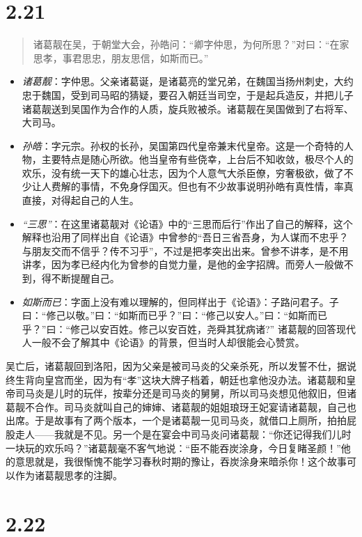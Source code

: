 \documentclass[]{book}
\providecommand{\tightlist}{%
  \setlength{\itemsep}{0pt}\setlength{\parskip}{0pt}}
\begin{document}
\section{2.21}\label{section-67}

\begin{quote}
诸葛靓在吴，于朝堂大会，孙皓问：``卿字仲思，为何所思？''对曰：``在家思孝，事君思忠，朋友思信，如斯而已。''
\end{quote}

\begin{itemize}
\tightlist
\item
  \emph{诸葛靓}：字仲思。父亲诸葛诞，是诸葛亮的堂兄弟，在魏国当扬州刺史，大约忠于魏国，受到司马昭的猜疑，要召入朝廷当司空，于是起兵造反，并把儿子诸葛靓送到吴国作为合作的人质，旋兵败被杀。诸葛靓在吴国做到了右将军、大司马。
\item
  \emph{孙皓}：字元宗。孙权的长孙，吴国第四代皇帝兼末代皇帝。这是一个奇特的人物，主要特点是随心所欲。他当皇帝有些侥幸，上台后不知收敛，极尽个人的欢乐，没有统一天下的雄心壮志，因为个人意气大杀臣僚，穷奢极欲，做了不少让人费解的事情，不免身俘国灭。但也有不少故事说明孙皓有真性情，率真直接，对得起自己的人生。
\item
  \emph{``三思''}：在这里诸葛靓对《论语》中的``三思而后行''作出了自己的解释，这个解释也沿用了同样出自《论语》中曾参的``吾日三省吾身，为人谋而不忠乎？与朋友交而不信乎？传不习乎''，不过是把孝突出出来。曾参不讲孝，是不用讲孝，因为孝已经内化为曾参的自觉力量，是他的金字招牌。而旁人一般做不到，得不断提醒自己。
\item
  \emph{如斯而已}：字面上没有难以理解的，但同样出于《论语》：子路问君子。子曰：``修己以敬。''曰：``如斯而已乎？''曰：``修己以安人。''曰：``如斯而已乎？''曰：``修己以安百姓。修己以安百姓，尧舜其犹病诸?''
  诸葛靓的回答现代人一般不会了解其中《论语》的背景，但当时人却很能会心赞赏。
\end{itemize}

吴亡后，诸葛靓回到洛阳，因为父亲是被司马炎的父亲杀死，所以发誓不仕，据说终生背向皇宫而坐，因为有``孝''这块大牌子档着，朝廷也拿他没办法。诸葛靓和皇帝司马炎是儿时的玩伴，按辈分还是司马炎的舅舅，所以司马炎想见他叙旧，但诸葛靓不合作。司马炎就叫自己的婶婶、诸葛靓的姐姐琅玡王妃宴请诸葛靓，自己也出席。于是故事有了两个版本，一个是诸葛靓一见司马炎，就借口上厕所，拍拍屁股走人------我就是不见。另一个是在宴会中司马炎问诸葛靓：``你还记得我们儿时一块玩的欢乐吗？''诸葛靓毫不客气地说：``臣不能吞炭涂身，今日复睹圣颜！''他的意思就是，我很惭愧不能学习春秋时期的豫让，吞炭涂身来暗杀你！这个故事可以作为诸葛靓思孝的注脚。

\section{2.22}\label{section-68}
\end{document}
